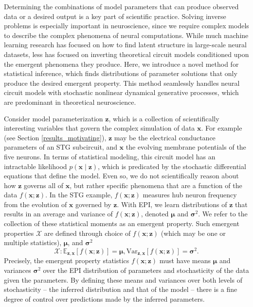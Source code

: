 \documentclass[11pt]{article}
\begin{document}
Determining the combinations of model parameters that can produce observed data or a desired output is a key part of scientific practice.
Solving inverse problems is especially important in neuroscience, since we require complex models to describe the complex phenomena of neural computations.
While much machine learning research has focused on how to find latent structure in large-scale neural datasets, less has focused on inverting theoretical circuit models conditioned upon the emergent phenomena they produce.
Here, we introduce a novel method for statistical inference, which finds distributions of parameter solutions that only produce the desired emergent property.
This method seamlessly handles neural circuit models with stochastic nonlinear dynamical generative processes, which are predominant in theoretical neuroscience.

 
Consider model parameterization $\mathbf{z}$, which is a collection of scientifically interesting variables that govern the complex simulation of data $\mathbf{x}$.
For example (see Section \ref{results_motivating}), $\mathbf{z}$ may be the electrical conductance parameters of an STG subcircuit, and $\mathbf{x}$ the evolving membrane potentials of the five neurons.
In terms of statistical modeling, this circuit model has an intractable likelihood $p(\mathbf{x} \mid \mathbf{z})$, which is predicated by the stochastic differential equations that define the model.
Even so, we do not scientifically reason about how $\mathbf{z}$ governs all of $\mathbf{x}$, but rather specific phenomena that are a function of the data $f(\mathbf{x}; \mathbf{z})$.
In the STG example, $f(\mathbf{x}; \mathbf{z})$ measures hub neuron frequency from the evolution of $\mathbf{x}$ governed by $\mathbf{z}$.
With EPI, we learn distributions of $\mathbf{z}$ that results in an average and variance of $f(\mathbf{x}; \mathbf{z})$, denoted $\bm{\mu}$ and $\bm{\sigma}^2$.
We refer to the collection of these statistical moments as an emergent property.
Such emergent properties $\mathcal{X}$ are defined through choice of $f(\mathbf{x}; \mathbf{z})$ (which may be one or multiple statistics), $\bm{\mu}$, and $\bm{\sigma}^2$
 \begin{equation}
\mathcal{X}: \mathbb{E}_{\mathbf{z},\mathbf{x}}\left[f(\mathbf{x}; \mathbf{z})\right] = \bm{\mu}, \text{Var}_{\mathbf{z},\mathbf{x}}\left[f(\mathbf{x}; \mathbf{z})\right] = \bm{\sigma}^2.
\end{equation}
Precisely, the emergent property statistics $f(\mathbf{x}; \mathbf{z})$ must have means $\bm{\mu}$ and variances $\bm{\sigma}^2$  over the EPI distribution of parameters and stochasticity of the data given the parameters.
By defining these means and variances over both levels of stochasticity -- the inferred distribution and that of the model -- there is a fine degree of control over predictions made by the inferred parameters.
\end{document}
